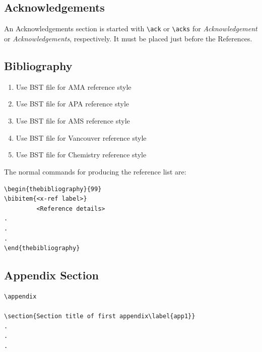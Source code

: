 \documentclass[AMA,STIX1COL]{WileyNJD-v2}
\begin{document}
\subsection{Acknowledgements} An Acknowledgements section is started with \verb"\ack" or
\verb"\acks" for \textit{Acknowledgement} or
\textit{Acknowledgements}, respectively. It must be placed just
before the References.

\subsection{Bibliography}
\begin{enumerate}[1]
\item Use \verb"" BST file for AMA reference style
\item Use \verb"" BST file for APA reference style
\item Use \verb"" BST file for AMS reference style
\item Use \verb"" BST file for Vancouver reference style
\item Use \verb"" BST file for Chemistry reference style
\end{enumerate}

The normal commands for producing the reference list are:

\begin{verbatim}
\begin{thebibliography}{99}
\bibitem{<x-ref label>}
         <Reference details>
.
.
.
\end{thebibliography}
\end{verbatim}

\subsection{Appendix Section}

\begin{verbatim}
\appendix

\section{Section title of first appendix\label{app1}}
.
.
.

\end{verbatim}
\end{document}
